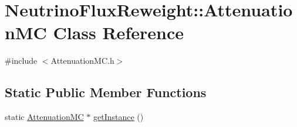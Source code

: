 \hypertarget{class_neutrino_flux_reweight_1_1_attenuation_m_c}{\section{Neutrino\-Flux\-Reweight\-:\-:Attenuation\-M\-C Class Reference}
\label{class_neutrino_flux_reweight_1_1_attenuation_m_c}
}


{\ttfamily \#include $<$Attenuation\-M\-C.\-h$>$}

\subsection*{Static Public Member Functions}
\begin{DoxyCompactItemize}
\item 
static \hyperlink{class_neutrino_flux_reweight_1_1_attenuation_m_c}{Attenuation\-M\-C} $\ast$ \hyperlink{class_neutrino_flux_reweight_1_1_attenuation_m_c_acc338217e771bf334014ed943015e6a1}{get\-Instance} ()
\end{DoxyCompactItemize}
